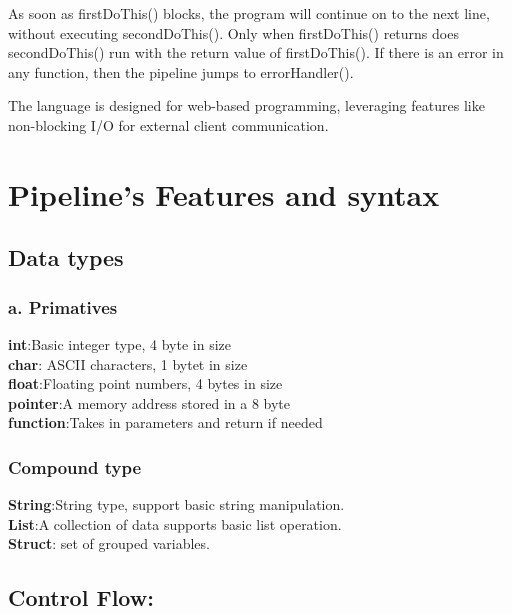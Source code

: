 \documentclass[11pt]{article}
\begin{document}
As soon as firstDoThis() blocks, the program will continue on to the next line, without executing secondDoThis(). Only when firstDoThis() returns does secondDoThis() run with the return value of firstDoThis(). If there is an error in any function, then the pipeline jumps to errorHandler().

The language is designed for web-based programming, leveraging features like non-blocking I/O for external client communication. 

\section{Pipeline's Features and syntax}
\subsection*{Data types}

\subsubsection*{a. Primatives}

\quad\space\space\textbf{int}:Basic integer type, 4 byte in size \\

\textbf{char}: ASCII characters, 1 bytet in size\\

\textbf{float}:Floating point numbers, 4 bytes in size\\

\textbf{pointer}:A memory address stored in a 8 byte\\

\textbf{function}:Takes in parameters and return if needed
\subsubsection{Compound type}

\quad\space\space\textbf{String}:String type, support basic string manipulation.\\

\textbf{List}:A collection of data supports basic list operation.\\

\textbf{Struct}: set of grouped variables.\\

\subsection{Control Flow:}
\end{document}
